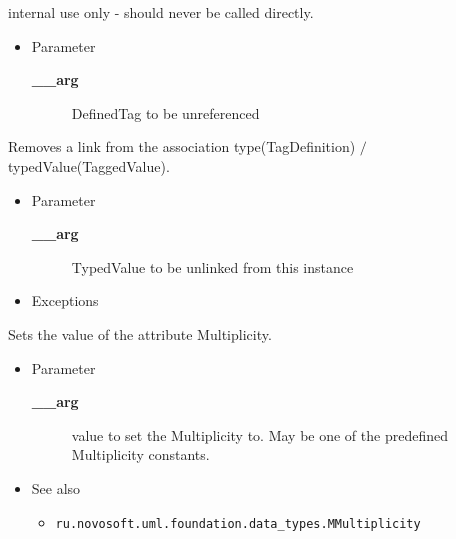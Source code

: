 \begin{desc}internal use only - should never be called directly.
\begin{itemize}
\item{Parameter
  \begin{description}
   \item[{\bf \_\_arg}]{DefinedTag to be unreferenced}
  \end{description}}
\end{itemize}
\end{desc}

\begin{desc}Removes a link from the association type(TagDefinition)
 $/$ typedValue(TaggedValue).
\begin{itemize}
\item{Parameter
  \begin{description}
   \item[{\bf \_\_arg}]{TypedValue to be unlinked from this instance}
  \end{description}}
\end{itemize}
\begin{itemize}
\item{{Exceptions}
}
\end{itemize}
\end{desc}

\begin{desc}Sets the value of the attribute Multiplicity.
\begin{itemize}
\item{Parameter
  \begin{description}
   \item[{\bf \_\_arg}]{value to set the Multiplicity to. May be one of the
              predefined Multiplicity constants.}
  \end{description}}
\end{itemize}
\begin{itemize}
\item{{See also}
  \begin{itemize}
   \item{{\tt ru.novosoft.uml.foundation.data\_types.MMultiplicity} {
}
}
  \end{itemize}
}
\end{itemize}
\end{desc}

